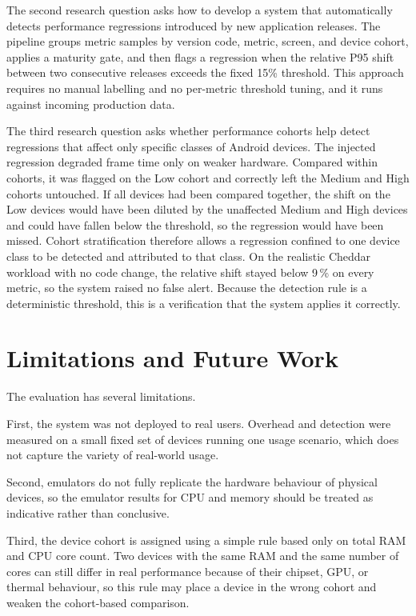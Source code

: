 The second research question asks how to develop a system that automatically detects performance regressions introduced by new application releases. The pipeline groups metric samples by version code, metric, screen, and device cohort, applies a maturity gate, and then flags a regression when the relative P95 shift between two consecutive releases exceeds the fixed 15\% threshold. This approach requires no manual labelling and no per-metric threshold tuning, and it runs against incoming production data.

The third research question asks whether performance cohorts help detect regressions that affect only specific classes of Android devices. The injected regression degraded frame time only on weaker hardware. Compared within cohorts, it was flagged on the Low cohort and correctly left the Medium and High cohorts untouched. If all devices had been compared together, the shift on the Low devices would have been diluted by the unaffected Medium and High devices and could have fallen below the threshold, so the regression would have been missed. Cohort stratification therefore allows a regression confined to one device class to be detected and attributed to that class. On the realistic Cheddar workload with no code change, the relative shift stayed below 9\,\% on every metric, so the system raised no false alert. Because the detection rule is a deterministic threshold, this is a verification that the system applies it correctly.

\section{Limitations and Future Work}
\label{sec:eval_limitations}

The evaluation has several limitations.

First, the system was not deployed to real users. Overhead and detection were measured on a small fixed set of devices running one usage scenario, which does not capture the variety of real-world usage.

Second, emulators do not fully replicate the hardware behaviour of physical devices, so the emulator results for CPU and memory should be treated as indicative rather than conclusive.

Third, the device cohort is assigned using a simple rule based only on total RAM and CPU core count. Two devices with the same RAM and the same number of cores can still differ in real performance because of their chipset, GPU, or thermal behaviour, so this rule may place a device in the wrong cohort and weaken the cohort-based comparison.

